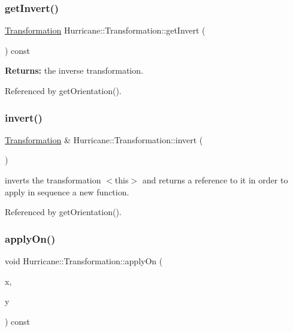 \mbox{\label{classHurricane_1_1Transformation_af9b37e39fb0ba02655eba41fe7779990}} 
\subsubsection{\texorpdfstring{get\+Invert()}{getInvert()}}
{\footnotesize\ttfamily \hyperlink{classHurricane_1_1Transformation}{Transformation} Hurricane\+::\+Transformation\+::get\+Invert (\begin{DoxyParamCaption}{ }\end{DoxyParamCaption}) const}

{\bfseries Returns\+:} the inverse transformation. 

Referenced by get\+Orientation().

\mbox{\label{classHurricane_1_1Transformation_a4d49d9fde0fe04eba9e8f0c7360f2c79}} 
\subsubsection{\texorpdfstring{invert()}{invert()}}
{\footnotesize\ttfamily \hyperlink{classHurricane_1_1Transformation}{Transformation} \& Hurricane\+::\+Transformation\+::invert (\begin{DoxyParamCaption}{ }\end{DoxyParamCaption})}

inverts the transformation {\ttfamily $<$this$>$} and returns a reference to it in order to apply in sequence a new function. 

Referenced by get\+Orientation().

\mbox{\label{classHurricane_1_1Transformation_ad37365bfd47851ca33519bb9a05b5402}} 
\subsubsection{\texorpdfstring{apply\+On()}{applyOn()}\hspace{0.1cm}{\footnotesize\ttfamily [1/4]}}
{\footnotesize\ttfamily void Hurricane\+::\+Transformation\+::apply\+On (\begin{DoxyParamCaption}\item[{\hyperlink{group__DbUGroup_ga4fbfa3e8c89347af76c9628ea06c4146}{Db\+U\+::\+Unit} \&}]{x,  }\item[{\hyperlink{group__DbUGroup_ga4fbfa3e8c89347af76c9628ea06c4146}{Db\+U\+::\+Unit} \&}]{y }\end{DoxyParamCaption}) const}

